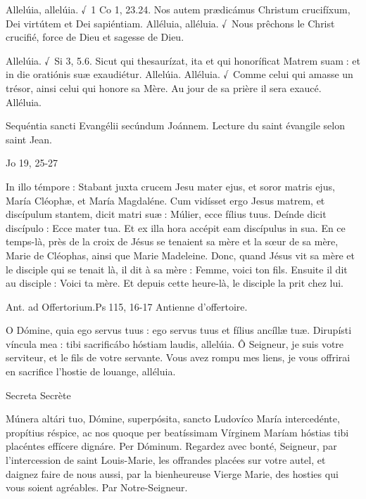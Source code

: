 \begin{paracol}{2}
Allelúia, allelúia. √~1 Co 1, 23.24. Nos autem prædicámus Christum crucifíxum, Dei virtútem et Dei sapiéntiam.
\switchcolumn
Alléluia, alléluia. √~Nous prêchons le Christ crucifié, force de Dieu et sagesse de Dieu.
\switchcolumn*

Allelúia. √~Si 3, 5.6. Sicut qui thesaurízat, ita et qui honoríficat Matrem suam : et in die oratiónis suæ exaudiétur. Allelúia.
\switchcolumn
Alléluia. √~Comme celui qui amasse un trésor, ainsi celui qui honore sa Mère. Au jour de sa prière il sera exaucé. Alléluia.
\switchcolumn*

Sequéntia sancti Evangélii secúndum Joánnem.
\switchcolumn
Lecture du saint évangile selon saint Jean.
\switchcolumn*

Jo 19, 25-27
\switchcolumn

\switchcolumn*

In illo témpore : Stabant juxta crucem  Jesu mater ejus, et soror matris ejus, María Cléophæ, et María Magdaléne. Cum vidísset ergo Jesus matrem, et discípulum stantem, dicit matri suæ : Múlier, ecce fílius tuus. Deínde dicit discípulo : Ecce mater tua. Et ex illa hora accépit eam discípulus in sua.
\switchcolumn
En ce temps-là, près de la croix de Jésus  se tenaient sa mère et la sœur de sa mère, Marie de Cléophas, ainsi que Marie Madeleine. Donc, quand Jésus vit sa mère et le disciple qui se tenait là, il dit à sa mère : Femme, voici ton fils. Ensuite il dit au disciple : Voici ta mère. Et depuis cette heure-là, le disciple la prit chez lui.
\switchcolumn*

Ant. ad Offertorium.\hfill Ps 115, 16-17
\switchcolumn
Antienne d’offertoire.
\switchcolumn*

O Dómine, quia ego servus tuus : ego servus tuus et fílius ancíllæ tuæ. Dirupísti víncula mea : tibi sacrificábo hóstiam laudis, allelúia.
\switchcolumn
Ô Seigneur, je suis votre serviteur, et le fils de votre servante. Vous avez rompu mes liens, je vous offrirai en sacrifice l’hostie de louange, alléluia.
\switchcolumn*

Secreta
\switchcolumn
Secrète
\switchcolumn*

Múnera altári tuo, Dómine,  superpósita, sancto Ludovíco María intercedénte, propítius réspice, ac nos quoque per beatíssimam Vírginem Maríam hóstias tibi placéntes effícere dignáre. Per Dóminum.
\switchcolumn
Regardez avec bonté, Seigneur, par l’intercession de saint Louis-Marie, les offrandes placées sur votre autel, et daignez faire de nous aussi, par la bienheureuse Vierge Marie, des hosties qui vous soient agréables. Par Notre-Seigneur.
\switchcolumn*


\end{paracol}
